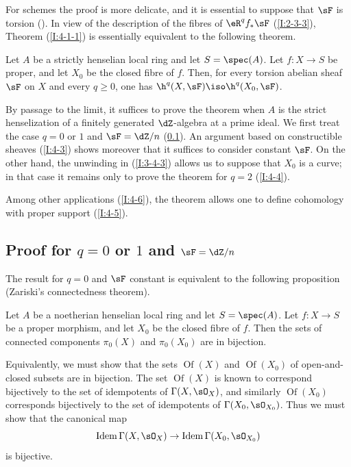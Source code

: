 \documentclass[oneside]{book}
\begin{document}
For schemes the proof is more delicate, and it is essential to suppose
that $\sF$ is torsion (\cite[XII.2]{sga4}). In view of the description of
the fibres of $\eR^qf_*\sF$ (\ref{I:2-3-3}), Theorem
(\ref{I:4-1-1}) is essentially equivalent to the following theorem.

\begin{theorem}\label{I:4-1-2}
Let $A$ be a strictly henselian local ring and let $S=\spec(A)$. Let
$f:X\to S$ be proper, and let $X_0$ be the closed fibre of $f$. Then, for every
torsion abelian sheaf $\sF$ on $X$ and every $q\geqslant0$, one has
$\h^q(X,\sF)\iso\h^q(X_0,\sF)$.
\end{theorem}

By passage to the limit, it suffices to prove the theorem when $A$ is the
strict henselization of a finitely generated $\dZ$-algebra at a prime
ideal. We first treat the case $q=0$ or $1$ and $\sF=\dZ/n$
(\ref{I:4-2}). An argument based on constructible sheaves (\ref{I:4-3})
shows moreover that it suffices to consider constant $\sF$. On the other
hand, the unwinding in (\ref{I:3-4-3}) allows us to suppose that $X_0$
is a curve; in that case it remains only to prove the theorem for $q=2$
(\ref{I:4-4}).

Among other applications (\ref{I:4-6}), the theorem allows one to define
cohomology with proper support (\ref{I:4-5}).

\subsection{Proof for \texorpdfstring{$q=0$}{q=0} or \texorpdfstring{$1$}{1} and \texorpdfstring{$\sF=\dZ/n$}{\sF=Z/n}}\label{I:4-2}

The result for $q=0$ and $\sF$ constant is equivalent to the following
proposition (Zariski's connectedness theorem).

\begin{proposition}\label{I:4-2-1}
Let $A$ be a noetherian henselian local ring and let $S=\spec(A)$. Let
$f:X\to S$ be a proper morphism, and let $X_0$ be the closed fibre of
$f$. Then the sets of connected components $\pi_0(X)$ and
$\pi_0(X_0)$ are in bijection.
\end{proposition}

Equivalently, we must show that the sets $\operatorname{Of}(X)$ and
$\operatorname{Of}(X_0)$ of open-and-closed subsets are in bijection.
The set $\operatorname{Of}(X)$ is known to correspond bijectively to the
set of idempotents of $\Gamma(X,\sO_X)$, and similarly
$\operatorname{Of}(X_0)$ corresponds bijectively to the set of
idempotents of $\Gamma(X_0,\sO_{X_0})$. Thus we must show that the
canonical map
\[
  \operatorname{Idem} \Gamma(X,\sO_X) \to \operatorname{Idem}\Gamma(X_0,\sO_{X_0})
\]
is bijective.
\end{document}
